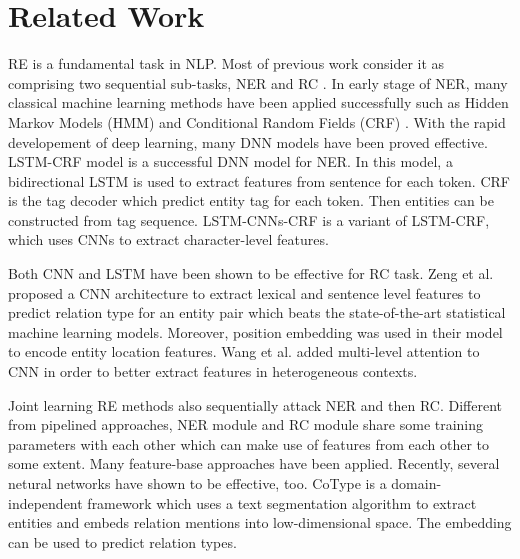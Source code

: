 \section{Related Work}
RE \cite{Bach} is a fundamental task in NLP. Most of previous work consider it 
as comprising two sequential sub-tasks, NER \cite{Nadeau2007} and 
RC \cite{Zeng2014,Wang2016,Wen2017,Cai2016,Zhou2016,Xu2015}. 
In early stage of NER, many classical machine learning methods have been applied
successfully such as Hidden Markov Models (HMM) \cite{Passos2014} 
and Conditional Random Fields (CRF) \cite{Luo2015}. With the rapid 
developement of deep learning, many DNN models have been
proved effective. LSTM-CRF \cite{Lample2016} model is a successful DNN model for NER. 
In this model, a bidirectional LSTM is used to extract features from sentence for each
token. CRF is the tag decoder which predict entity tag for each token. Then
entities can be constructed from tag sequence. 
LSTM-CNNs-CRF \cite{Ma2016} is a variant of
LSTM-CRF, which uses CNNs to extract character-level features.

Both CNN and LSTM have been shown to be effective for RC task. 
Zeng et al. proposed a CNN architecture \cite{Zeng2014} to extract
lexical and sentence level features to predict relation type for an entity pair
which beats the state-of-the-art statistical machine learning models. Moreover,
position embedding was used in their model to encode entity location features.
Wang et al. added multi-level attention \cite{Wang2016} to CNN in order to 
better extract features in heterogeneous contexts.

Joint learning RE methods also sequentially attack NER and then RC. 
Different from pipelined approaches, NER module and RC module share some training
parameters with each other which can make use of features from each other to
some extent. Many feature-base approaches \cite{Ren2017,Li2014,Miwa2014,Kate2010} 
have been applied. Recently, several netural networks
\cite{Zheng2017,Katiyar2017,Miwa2016,Zheng2017a,Li2017a,Miwa2014} have shown to
be effective, too. CoType \cite{Ren2017} is a domain-independent
framework which uses a text segmentation algorithm to extract entities and embeds
relation mentions into low-dimensional space. The embedding can be used to
predict relation types.

